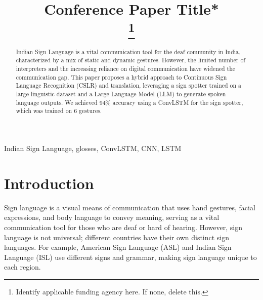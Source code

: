 \documentclass[conference]{IEEEtran}
\begin{document}
\title{Conference Paper Title*\\
\thanks{Identify applicable funding agency here. If none, delete this.}
}

\author{
\and
{}
\and
{}
}

\maketitle

\begin{abstract}
Indian Sign Language is a vital communication tool for the deaf community in India, characterized by a mix of static and dynamic gestures. However, the limited number of interpreters and the increasing reliance on digital communication have widened the communication gap. This paper proposes a hybrid approach to Continuous Sign Language Recognition (CSLR) and translation, leveraging a sign spotter trained on a large linguistic dataset and a Large Language Model (LLM) to generate spoken language outputs. We achieved 94\% accuracy using a ConvLSTM for the sign spotter, which was trained on 6 gestures.
\end{abstract}

\begin{IEEEkeywords}
Indian Sign Language, glosses, ConvLSTM, CNN, LSTM
\end{IEEEkeywords}

\section{Introduction}
Sign language is a visual means of communication that uses hand gestures, facial expressions, and body language to convey meaning, serving as a vital communication tool for those who are deaf or hard of hearing. However, sign language is not universal; different countries have their own distinct sign languages. For example, American Sign Language (ASL) and Indian Sign Language (ISL) use different signs and grammar, making sign language unique to each region.
\end{document}
